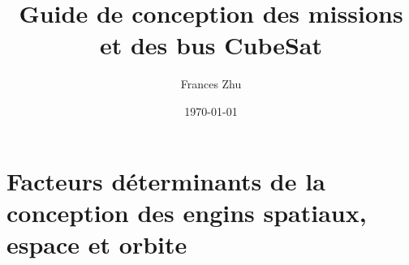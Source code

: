 \documentclass[a4paper,12pt]{book} %
\begin{document}
\title{Guide de conception des missions et des bus CubeSat}
\author{Frances Zhu}
\date{\today}
\maketitle %
\tableofcontents %
\chapter{Facteurs déterminants de la conception des engins spatiaux, espace et orbite}
%
%
%



% 
%
%
%
%
%
%
%



 
\end{document}
